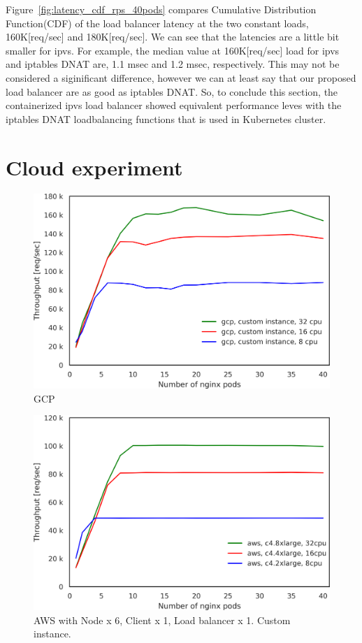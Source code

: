 Figure~\ref{fig:latency_cdf_rps_40pods} compares Cumulative Distribution Function(CDF) of the load balancer latency at the two constant loads, 160K[req/sec] and 180K[req/sec].
We can see that the latencies are a little bit smaller for ipvs.
For example, the median value at 160K[req/sec] load for ipvs and iptables DNAT are, 1.1 msec and 1.2 msec, respectively.
This may not be considered a siginificant difference, however we can at least say that our proposed load balancer are as good as iptables DNAT.
So, to conclude this section, the containerized ipvs load balancer showed equivalent performance leves with the iptables DNAT loadbalancing functions that is used in Kubernetes cluster.

\FloatBarrier

\section{Cloud experiment}

\begin{figure}[t]
  \centering
  \includegraphics[width=0.8\columnwidth]{Figs/gcp_all_tp}
  \caption{GCP}
  \label{fig:gcp_all_ieice}
\end{figure}

\begin{figure}[t]
  \centering
  \includegraphics[width=0.8\columnwidth]{Figs/aws_c4_tp}
  \caption{AWS with Node x 6, Client x 1, Load balancer x 1. Custom instance. }
  \label{fig:aws_c4_ieice}
\end{figure}

